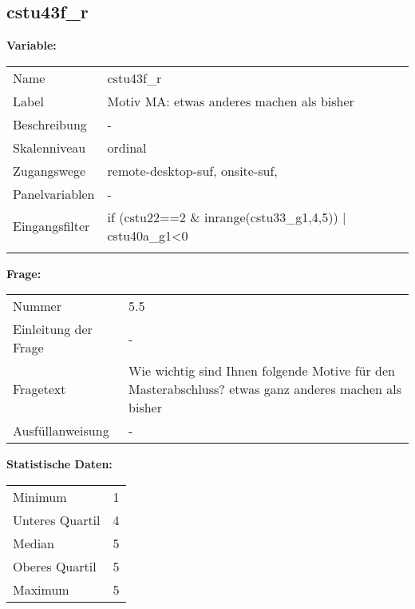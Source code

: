 	
	
	\subsection{cstu43f\_r}
	\label{subSection:cstu43f_r}

	\noindent\textbf{Variable:}\\
		\begin{tabular}{lL{11.3cm}}
			\label{tableVariable:cstu43f_r}
			Name & cstu43f\_r \\
			Label & Motiv MA: etwas anderes machen als bisher \\
			Beschreibung & - \\
			Skalenniveau & ordinal \\
			Zugangswege &
				remote-desktop-suf,
				onsite-suf,
 \\
			Panelvariablen & -
			 \\
			Eingangsfilter & if (cstu22==2 \& inrange(cstu33\_g1,4,5)) | cstu40a\_g1\textless{}0 \\
 \\
		\end{tabular}

		\vspace*{1 cm}
		\noindent\textbf{Frage:}\\
		\begin{tabular}{lL{11.3cm}}
			\label{tableQuestion:cstu43f_r}
			Nummer & 5.5 \\
			Einleitung der Frage & - \\
			Fragetext & Wie wichtig sind Ihnen folgende Motive für den Masterabschluss?
etwas ganz anderes machen als bisher \\
			Ausfüllanweisung & - \\
		\end{tabular}


		\vspace*{1 cm}
		\noindent\textbf{Statistische Daten:}\\
			\begin{tabular}{ll}
				\label{tableStatistics:cstu43f_r}
					Minimum & 1 \\
					Unteres Quartil & 4 \\
					Median & 5 \\
					Oberes Quartil & 5 \\
					Maximum & 5 \\
			\end{tabular}



